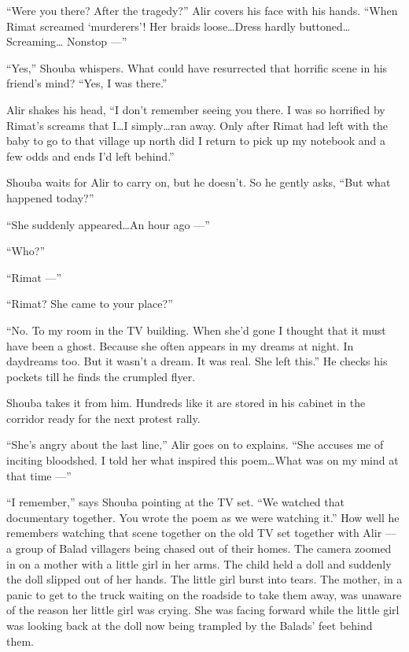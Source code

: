 \documentclass[twoside,11pt,openany]{book}
\begin{document}
``Were you there? After the tragedy?'' Alir covers his face with his hands.
``When Rimat screamed `murderers'! Her braids loose{\ldots}Dress hardly buttoned{\ldots}Screaming{\ldots}
Nonstop ---''

``Yes,'' Shouba whispers. What could have resurrected that horrific scene in his friend's
mind?  {}``Yes, I was there.''

Alir shakes his head, ``I don't remember seeing you there.{ }I was so horrified by Rimat's
screams that I{\ldots}I simply{\ldots}ran away. Only after Rimat had left with the baby to go to that village up north
did I return to pick up my notebook and a few odds and ends I'd left behind.''

Shouba waits for Alir to carry on, but he doesn't. So he gently asks, ``But what happened
today?''

``She suddenly appeared{\ldots}An hour ago ---''

``Who?''

``Rimat ---''

``Rimat? She came to your place?''

``No. To my room in the TV building. When she'd gone I thought that it must have been a ghost. Because she
often appears in my dreams at night. In daydreams too. But it wasn't a dream. It was real. She left
this.'' He checks his pockets till he finds the crumpled flyer.

Shouba takes it from him. Hundreds like it are stored in his cabinet in the corridor ready for the next protest rally.

``She's angry about the last line,'' Alir goes on to explains. ``She accuses me
of inciting bloodshed. I told her what inspired this poem{\ldots}What was on my mind at that time ---''

``I remember,'' says Shouba pointing at the TV set. ``We watched that documentary
together. You wrote the poem as we were watching it.'' How well he remembers watching that scene together
on the old TV set together with Alir ---  a group of Balad villagers being chased out of their homes. The camera
zoomed in on a mother with a little girl in her arms. The child held a doll and suddenly the doll slipped out of her
hands. The little girl burst into tears. The mother, in a panic to get to the truck waiting on the roadside to take
them away, was unaware of the reason her little girl was crying. She was facing forward while the little girl was
looking back at the doll now being trampled by the Balads{'} feet behind them.
\end{document}
